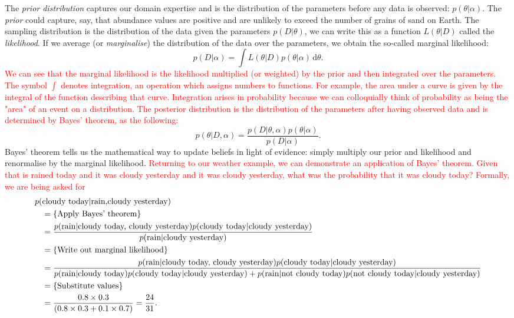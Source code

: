 \documentclass[12pt,english, journal=jpr, layout=twocolumn]{article}
\begin{document}
The \textit{prior distribution} captures our domain expertise and is the distribution of the parameters before any data is observed: $p(\theta|\alpha)$. The \textit{prior} could capture, say, that abundance values are positive and are unlikely to exceed the number of grains of sand on Earth. The sampling distribution is the distribution of the data given the parameters $p(D|\theta)$, we can write this as a function $L(\theta|D)$ called the \textit{likelihood}. If we average (or \textit{marginalise}) the distribution of the data over the parameters, we obtain the so-called marginal likelihood:
\begin{equation}
p(D|\alpha) = \int L(\theta|D)p(\theta|\alpha)\,\text{d}\theta.
\end{equation}
\textcolor{red}{We can see that the marginal likelihood is the likelihood multiplied (or weighted) by the prior and then integrated over the parameters. The symbol $\int$ denotes integration, an operation which assigns numbers to functions. For example, the area under a curve is given by the integral of the function describing that curve. Integration arises in probability because we can colloquially think of probability as being the "area" of an event on a distribution. The posterior distribution is the distribution of the parameters after having observed data and is determined by Bayes' theorem, as the following:}
\begin{equation}
p(\theta|D, \alpha) = \frac{p(D|\theta, \alpha)p(\theta|\alpha)}{p(D|\alpha)}.
\end{equation}
Bayes' theorem tells us the mathematical way to update beliefs in light of evidence: simply multiply our prior and likelihood and renormalise by the marginal likelihood. \textcolor{red}{Returning to our weather example, we can demonstrate an application of Bayes' theorem. Given that is rained today and it was cloudy yesterday and it was cloudy yesterday, what was the probability that it was cloudy today? Formally, we are being asked for
\scriptsize
\begin{equation}
\begin{split}
p(&\text{cloudy today}|\text{rain,cloudy yesterday}) \\
& = \left\{\text{Apply Bayes' theorem}\right\}\\
& = \frac{p(\text{rain}|\text{cloudy today, cloudy yesterday})p(\text{cloudy today|\text{cloudy yesterday}})}{p(\text{rain}|\text{cloudy yesterday})}\\
& = \left\{\text{Write out marginal likelihood}\right\}\\
& = \frac{p(\text{rain}|\text{cloudy today, cloudy yesterday})p(\text{cloudy today|\text{cloudy yesterday}})}{p(\text{rain}|\text{cloudy today})p(\text{cloudy today|cloudy yesterday}) + p(\text{rain}|\text{not cloudy today})p(\text{not cloudy today|cloudy yesterday}) }\\
& = \left\{\text{Substitute values}\right\}\\
& = \frac{0.8 \times 0.3}{(0.8 \times 0.3 + 0.1 \times 0.7)} = \frac{24}{31}.
\end{split}	
\end{equation}}
\end{document}
